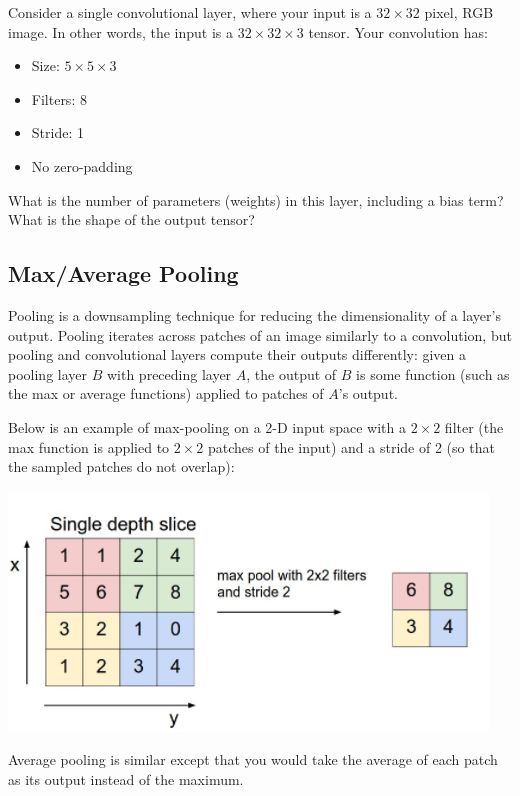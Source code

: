 Consider a single convolutional layer, where your input is a $32 \times 32$ pixel, RGB image. In other words, the input is a $32 \times 32 \times 3$ tensor. Your convolution has:

\begin{itemize}
\item Size: $5 \times 5 \times 3$
\item Filters: 8
\item Stride: 1
\item No zero-padding
\end{itemize}

\problem[2] What is the number of parameters (weights) in this layer, including a bias term? What is the shape of the output tensor?

\begin{subsolution}

\end{subsolution}


 \subsection{Max/Average Pooling}

Pooling is a downsampling technique for reducing the dimensionality of a layer's output. Pooling iterates across patches of an image similarly to a convolution, but pooling and convolutional layers compute their outputs differently: given a pooling layer $B$ with preceding layer $A$, the output of $B$ is some function (such as the max or average functions) applied to patches of $A$'s output.

Below is an example of max-pooling on a 2-D input space with a $2\times 2$ filter (the max function is applied to $2\times 2$ patches of the input) and a stride of 2 (so that the sampled patches do not overlap):

\begin{center}
  \includegraphics[width=.49\textwidth]{Plots/MaxPool.png}
\end{center}

Average pooling is similar except that you would take the average of each patch as its output instead of the maximum.


